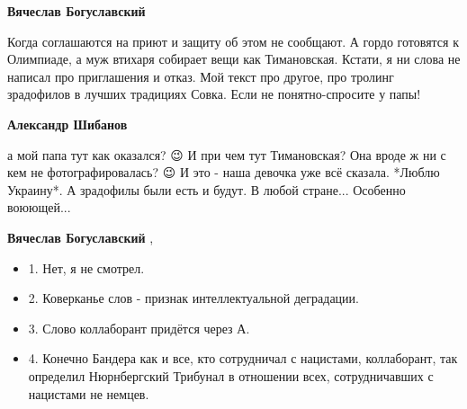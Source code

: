 \begin{itemize}
\begin{itemize}
 
\textbf{Вячеслав Богуславский} 

Когда соглашаются на приют и защиту об этом не
сообщают. А гордо готовятся к Олимпиаде, а муж втихаря собирает вещи как
Тимановская. Кстати, я ни слова не написал про приглашения и отказ. Мой текст про
другое, про тролинг зрадофилов в лучших традициях Совка. Если не понятно-спросите
у папы!

 
\textbf{Александр Шибанов} 

а мой папа тут как оказался? 😉 И при чем тут Тимановская? Она вроде ж ни с кем
не фотографировалась? 😉 И это - наша девочка уже всё сказала. *Люблю Украину*.
А зрадофилы были есть и будут. В любой стране... Особенно воюющей...


 
\textbf{Вячеслав Богуславский} , 

\begin{itemize}
\item 1. Нет, я не смотрел.
\item 2. Коверканье слов - признак интеллектуальной деградации.
\item 3. Слово коллаборант придётся через А.
\item 4. Конечно Бандера как и все, кто сотрудничал с нацистами, коллаборант, так
определил Нюрнбергский Трибунал в отношении всех, сотрудничавших с нацистами не
немцев.
\end{itemize}


 

\end{itemize}
\end{itemize}
